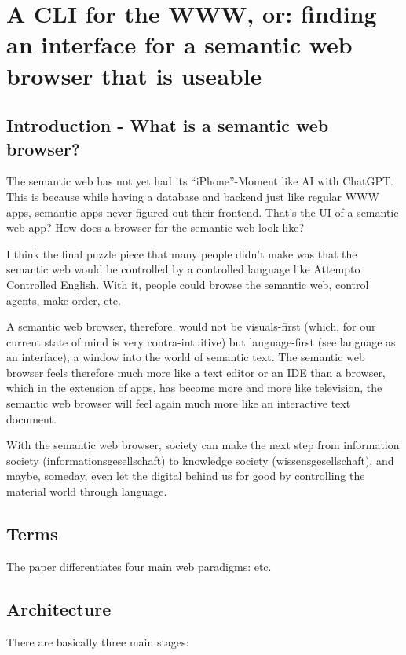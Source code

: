\documentclass[12pt,a4paper]{article}
\begin{document}
\section{A CLI for the WWW, or: finding an interface for a semantic web browser that is useable}

\subsection{Introduction - What is a semantic web browser?}

The semantic web has not yet had its ``iPhone''-Moment like AI with ChatGPT. This is because while having a database and backend just like regular WWW apps, semantic apps never figured out their frontend. That's the UI of a semantic web app? How does a browser for the semantic web look like?

I think the final puzzle piece that many people didn't make was that the semantic web would be controlled by a controlled language like Attempto Controlled English. With it, people could browse the semantic web, control agents, make order, etc.

A semantic web browser, therefore, would not be visuals-first (which, for our current state of mind is very contra-intuitive) but language-first (see language as an interface), a window into the world of semantic text. The semantic web browser feels therefore much more like a text editor or an IDE than a browser, which in the extension of apps, has become more and more like television, the semantic web browser will feel again much more like an interactive text document.

With the semantic web browser, society can make the next step from information society (informationsgesellschaft) to knowledge society (wissensgesellschaft), and maybe, someday, even let the digital behind us for good by controlling the material world through language.

\subsection{Terms}

The paper differentiates four main web paradigms: etc.

\subsection{Architecture}

There are basically three main stages:
\end{document}
